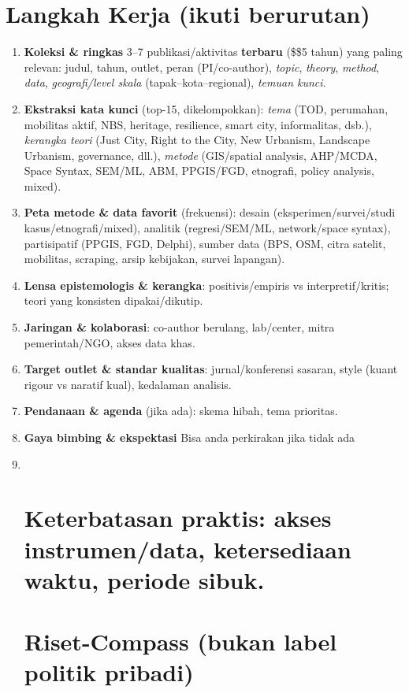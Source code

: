 \documentclass[
  indonesian,
]{article}
\begin{document}
\section{Langkah Kerja (ikuti
berurutan)}\label{langkah-kerja-ikuti-berurutan}

\begin{enumerate}
\def\labelenumi{\arabic{enumi}.}
\item
  \textbf{Koleksi \& ringkas} 3--7 publikasi/aktivitas \textbf{terbaru}
  (\$\leq\$5 tahun) yang paling relevan: judul, tahun, outlet, peran
  (PI/co-author), \emph{topic}, \emph{theory}, \emph{method},
  \emph{data}, \emph{geografi/level skala} (tapak--kota--regional),
  \emph{temuan kunci}.
\item
  \textbf{Ekstraksi kata kunci} (top-15, dikelompokkan): \emph{tema}
  (TOD, perumahan, mobilitas aktif, NBS, heritage, resilience, smart
  city, informalitas, dsb.), \emph{kerangka teori} (Just City, Right to
  the City, New Urbanism, Landscape Urbanism, governance, dll.),
  \emph{metode} (GIS/spatial analysis, AHP/MCDA, Space Syntax, SEM/ML,
  ABM, PPGIS/FGD, etnografi, policy analysis, mixed).
\item
  \textbf{Peta metode \& data favorit} (frekuensi): desain
  (eksperimen/survei/studi kasus/etnografi/mixed), analitik
  (regresi/SEM/ML, network/space syntax), partisipatif (PPGIS, FGD,
  Delphi), sumber data (BPS, OSM, citra satelit, mobilitas, scraping,
  arsip kebijakan, survei lapangan).
\item
  \textbf{Lensa epistemologis \& kerangka}: positivis/empiris vs
  interpretif/kritis; teori yang konsisten dipakai/dikutip.
\item
  \textbf{Jaringan \& kolaborasi}: co-author berulang, lab/center, mitra
  pemerintah/NGO, akses data khas.
\item
  \textbf{Target outlet \& standar kualitas}: jurnal/konferensi sasaran,
  style (kuant rigour vs naratif kual), kedalaman analisis.
\item
  \textbf{Pendanaan \& agenda} (jika ada): skema hibah, tema prioritas.
\item
  \textbf{Gaya bimbing \& ekspektasi} Bisa anda perkirakan jika tidak
  ada~
\item ~
  \section{\texorpdfstring{\textbf{Keterbatasan praktis}: akses
  instrumen/data, ketersediaan waktu, periode
  sibuk.}{Keterbatasan praktis: akses instrumen/data, ketersediaan waktu, periode sibuk.}}\label{keterbatasan-praktis-akses-instrumendata-ketersediaan-waktu-periode-sibuk.}

  \section{Riset-Compass (bukan label politik
  pribadi)}\label{riset-compass-bukan-label-politik-pribadi}
\end{enumerate}
\end{document}
